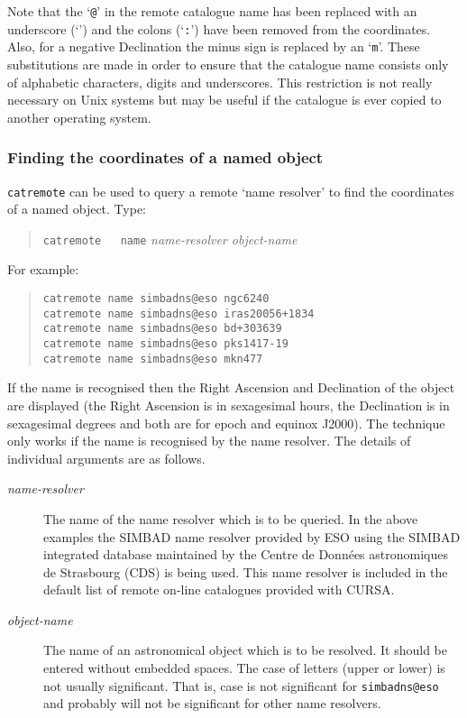 \documentclass[twoside,11pt]{article}
\newcommand{\htmladdnormallink}[2]{#1}
\renewcommand{\_}{\texttt{\symbol{95}}}
\begin{document}
Note that the `{\tt @}' in the remote catalogue name has been replaced
with an underscore (`{\tt \_}') and the colons (`{\tt :}') have been
removed from the coordinates.  Also, for a negative Declination the
minus sign is replaced by an `{\tt m}'.  These substitutions are made
in order to ensure that the catalogue name consists only of alphabetic
characters, digits and underscores.  This restriction is not really
necessary on Unix systems but may be useful if the catalogue is ever
copied to another operating system.

\subsubsection{Finding the coordinates of a named object}

{\tt catremote} can be used to query a remote `name resolver' to find
the coordinates of a named object.  Type:

\begin{verse}
{\tt catremote ~ name} {\it name-resolver object-name}
\end{verse}

For example:

\begin{verse}
{\tt catremote name simbad\_ns@eso ngc6240   \\
catremote name simbad\_ns@eso iras20056+1834 \\
catremote name simbad\_ns@eso bd+303639 \\
catremote name simbad\_ns@eso pks1417-19 \\
catremote name simbad\_ns@eso mkn477}
\end{verse}

If the name is recognised then the Right Ascension and Declination of the
object are displayed (the Right Ascension is in sexagesimal hours, the
Declination is in sexagesimal degrees and both are for epoch and equinox
J2000).  The technique only works if the name is recognised by the name
resolver.  The details of individual arguments are as follows.

\begin{description}

  \item[{\it name-resolver}\/] The name of the name resolver which is to
   be queried.  In the above examples the SIMBAD name resolver provided by
   ESO using the SIMBAD integrated database maintained by the
   \htmladdnormallink{Centre de Donn\'{e}es astronomiques de Strasbourg}
   {http://cdsweb.u-strasbg.fr/CDS.html} (CDS) is being used.  This name
   resolver is included in the default list of remote on-line catalogues
   provided with CURSA.

  \item[{\it object-name}] The name of an astronomical object which is to
   be resolved.  It should be entered without embedded spaces.  The case of
   letters (upper or lower) is not usually significant.  That is, case is
   not significant for {\tt simbad\_ns@eso} and probably will not be
   significant for other name resolvers.

\end{description}
\end{document}
